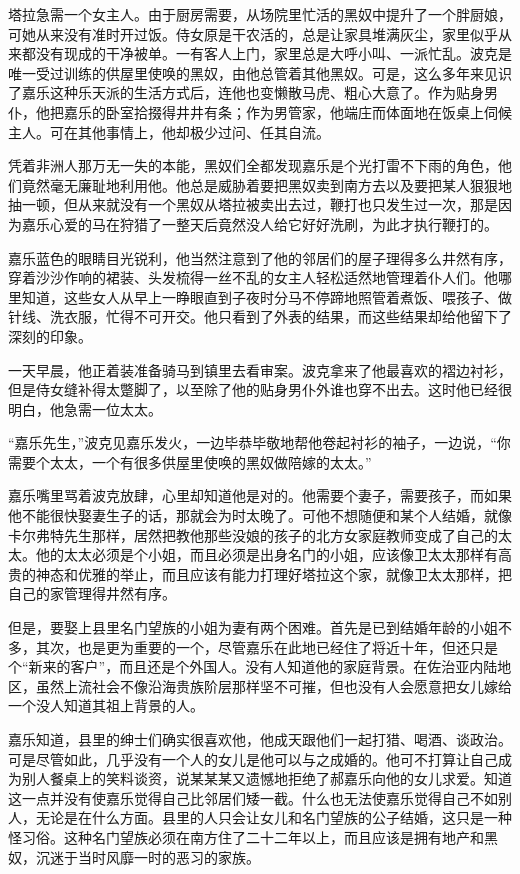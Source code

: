 \par 塔拉急需一个女主人。由于厨房需要，从场院里忙活的黑奴中提升了一个胖厨娘，可她从来没有准时开过饭。侍女原是干农活的，总是让家具堆满灰尘，家里似乎从来都没有现成的干净被单。一有客人上门，家里总是大呼小叫、一派忙乱。波克是唯一受过训练的供屋里使唤的黑奴，由他总管着其他黑奴。可是，这么多年来见识了嘉乐这种乐天派的生活方式后，连他也变懒散马虎、粗心大意了。作为贴身男仆，他把嘉乐的卧室拾掇得井井有条；作为男管家，他端庄而体面地在饭桌上伺候主人。可在其他事情上，他却极少过问、任其自流。
\par 凭着非洲人那万无一失的本能，黑奴们全都发现嘉乐是个光打雷不下雨的角色，他们竟然毫无廉耻地利用他。他总是威胁着要把黑奴卖到南方去以及要把某人狠狠地抽一顿，但从来就没有一个黑奴从塔拉被卖出去过，鞭打也只发生过一次，那是因为嘉乐心爱的马在狩猎了一整天后竟然没人给它好好洗刷，为此才执行鞭打的。
\par 嘉乐蓝色的眼睛目光锐利，他当然注意到了他的邻居们的屋子理得多么井然有序，穿着沙沙作响的裙装、头发梳得一丝不乱的女主人轻松适然地管理着仆人们。他哪里知道，这些女人从早上一睁眼直到子夜时分马不停蹄地照管着煮饭、喂孩子、做针线、洗衣服，忙得不可开交。他只看到了外表的结果，而这些结果却给他留下了深刻的印象。
\par 一天早晨，他正着装准备骑马到镇里去看审案。波克拿来了他最喜欢的褶边衬衫，但是侍女缝补得太蹩脚了，以至除了他的贴身男仆外谁也穿不出去。这时他已经很明白，他急需一位太太。
\par “嘉乐先生，”波克见嘉乐发火，一边毕恭毕敬地帮他卷起衬衫的袖子，一边说，“你需要个太太，一个有很多供屋里使唤的黑奴做陪嫁的太太。”
\par 嘉乐嘴里骂着波克放肆，心里却知道他是对的。他需要个妻子，需要孩子，而如果他不能很快娶妻生子的话，那就会为时太晚了。可他不想随便和某个人结婚，就像卡尔弗特先生那样，居然把教他那些没娘的孩子的北方女家庭教师变成了自己的太太。他的太太必须是个小姐，而且必须是出身名门的小姐，应该像卫太太那样有高贵的神态和优雅的举止，而且应该有能力打理好塔拉这个家，就像卫太太那样，把自己的家管理得井然有序。
\par 但是，要娶上县里名门望族的小姐为妻有两个困难。首先是已到结婚年龄的小姐不多，其次，也是更为重要的一个，尽管嘉乐在此地已经住了将近十年，但还只是个“新来的客户”，而且还是个外国人。没有人知道他的家庭背景。在佐治亚内陆地区，虽然上流社会不像沿海贵族阶层那样坚不可摧，但也没有人会愿意把女儿嫁给一个没人知道其祖上背景的人。
\par 嘉乐知道，县里的绅士们确实很喜欢他，他成天跟他们一起打猎、喝酒、谈政治。可是尽管如此，几乎没有一个人的女儿是他可以与之成婚的。他可不打算让自己成为别人餐桌上的笑料谈资，说某某某又遗憾地拒绝了郝嘉乐向他的女儿求爱。知道这一点并没有使嘉乐觉得自己比邻居们矮一截。什么也无法使嘉乐觉得自己不如别人，无论是在什么方面。县里的人只会让女儿和名门望族的公子结婚，这只是一种怪习俗。这种名门望族必须在南方住了二十二年以上，而且应该是拥有地产和黑奴，沉迷于当时风靡一时的恶习的家族。
